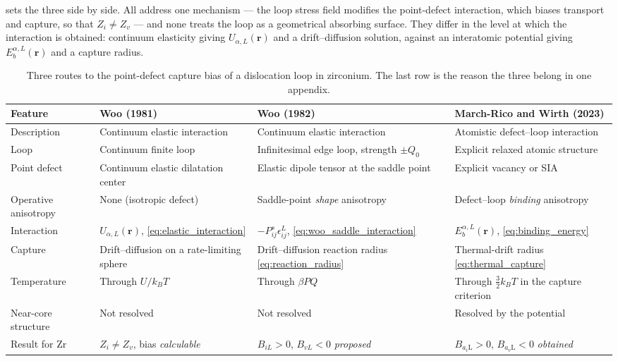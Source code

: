 \documentclass{article}
\newcommand{\aiL}{a_{i}\mathrm{L}}
\newcommand{\avL}{a_{v}\mathrm{L}}
\begin{document}
 sets the three side by side. All address one mechanism
--- the loop stress field modifies the point-defect interaction, which biases
transport and capture, so that $Z_i\neq Z_v$ --- and none treats the loop as a
geometrical absorbing surface. They differ in the level at which the interaction
is obtained: continuum elasticity giving $U_{\alpha,L}(\bm r)$ and a
drift--diffusion solution, against an interatomic potential giving
$E_b^{\alpha,L}(\bm r)$ and a capture radius.

\begin{table}[htbp]
\centering
\small
\caption{Three routes to the point-defect capture bias of a dislocation loop in
zirconium. The last row is the reason the three belong in one appendix.}
\label{tab:capture-bias}
\begin{tabularx}{\textwidth}{@{}l X X X@{}}
\toprule
Feature & Woo (1981) \citep{woo1981sink}
        & Woo (1982) \citep{woo1982intrinsic}
        & March-Rico and Wirth (2023) \citep{marchrico2023}\\
\midrule
Description & Continuum elastic interaction
            & Continuum elastic interaction
            & Atomistic defect--loop interaction\\
Loop & Continuum finite loop
     & Infinitesimal edge loop, strength $\pm Q_0$
     & Explicit relaxed atomic structure\\
Point defect & Continuum elastic dilatation center
             & Elastic dipole tensor at the saddle point
             & Explicit vacancy or SIA\\
Operative anisotropy & None (isotropic defect)
                     & Saddle-point \emph{shape} anisotropy
                     & Defect--loop \emph{binding} anisotropy\\
Interaction & $U_{\alpha,L}(\bm r)$, \cref{eq:elastic_interaction}
            & $-P^s_{ij}\epsilon^L_{ij}$, \cref{eq:woo_saddle_interaction}
            & $E_b^{\alpha,L}(\bm r)$, \cref{eq:binding_energy}\\
Capture & Drift--diffusion on a rate-limiting sphere
        & Drift--diffusion reaction radius \cref{eq:reaction_radius}
        & Thermal-drift radius \cref{eq:thermal_capture}\\
Temperature & Through $U/k_BT$
            & Through $\beta P Q$
            & Through $\tfrac32k_BT$ in the capture criterion\\
Near-core structure & Not resolved
                    & Not resolved
                    & Resolved by the potential\\
Result for Zr & $Z_i\neq Z_v$, bias \emph{calculable}
              & $B_{iL}>0$, $B_{vL}<0$ \emph{proposed}
              & $B_{\aiL}>0$, $B_{\avL}<0$ \emph{obtained}\\
\bottomrule
\end{tabularx}
\end{table}
\end{document}
